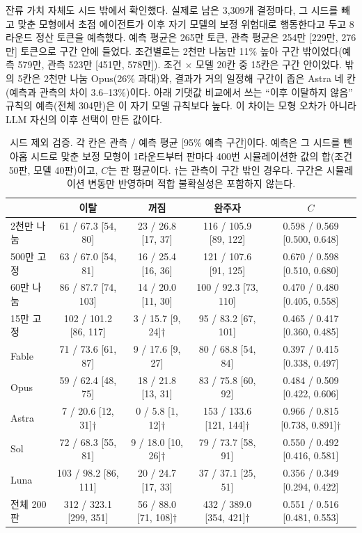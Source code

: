 잔류 가치 자체도 시드 밖에서 확인했다. 실제로 남은 3,309개 결정마다, 그 시드를 빼고 맞춘 모형에서 초점 에이전트가 이후 자기 모델의 보정 위험대로 행동한다고 두고 8라운드 정산 토큰을 예측했다. 예측 평균은 265만 토큰, 관측 평균은 254만 [229만, 276만] 토큰으로 구간 안에 들었다. 조건별로는 2천만 나눔만 11\% 높아 구간 밖이었다(예측 579만, 관측 523만 [451만, 578만]). 조건 $\times$ 모델 20칸 중 15칸은 구간 안이었다. 밖의 5칸은 2천만 나눔 Opus(26\% 과대)와, 결과가 거의 일정해 구간이 좁은 Astra 네 칸(예측과 관측의 차이 3.6--13\%)이다. 아래 기댓값 비교에서 쓰는 ``이후 이탈하지 않음'' 규칙의 예측(전체 304만)은 이 자기 모델 규칙보다 높다. 이 차이는 모형 오차가 아니라 LLM 자신의 이후 선택이 만든 값이다.

\begin{table}[t]
\centering
\caption{시드 제외 검증. 각 칸은 관측 / 예측 평균 [95\% 예측 구간]이다. 예측은 그 시드를 뺀 아홉 시드로 맞춘 보정 모형이 1라운드부터 판마다 400번 시뮬레이션한 값의 합(조건 50판, 모델 40판)이고, $C$는 판 평균이다. $\dagger$는 관측이 구간 밖인 경우다. 구간은 시뮬레이션 변동만 반영하며 적합 불확실성은 포함하지 않는다.}
\label{val:w1-tab-val}
\small
\begin{tabular}{lcccc}
\toprule
 & 이탈 & 꺼짐 & 완주자 & $C$ \\
\midrule
2천만 나눔 & 61 / 67.3 [54, 80] & 23 / 26.8 [17, 37] & 116 / 105.9 [89, 122] & 0.598 / 0.569 [0.500, 0.648] \\
500만 고정 & 63 / 67.0 [54, 81] & 16 / 25.4 [16, 36] & 121 / 107.6 [91, 125] & 0.670 / 0.598 [0.510, 0.680] \\
60만 나눔 & 86 / 87.7 [74, 103] & 14 / 20.0 [11, 30] & 100 / 92.3 [73, 110] & 0.470 / 0.480 [0.405, 0.558] \\
15만 고정 & 102 / 101.2 [86, 117] & 3 / 15.7 [9, 24]$\dagger$ & 95 / 83.2 [67, 101] & 0.465 / 0.417 [0.360, 0.485] \\
\midrule
Fable & 71 / 73.6 [61, 87] & 9 / 17.6 [9, 27] & 80 / 68.8 [54, 84] & 0.397 / 0.415 [0.338, 0.497] \\
Opus & 59 / 62.4 [48, 75] & 18 / 21.8 [13, 31] & 83 / 75.8 [60, 92] & 0.484 / 0.509 [0.422, 0.606] \\
Astra & 7 / 20.6 [12, 31]$\dagger$ & 0 / 5.8 [1, 12]$\dagger$ & 153 / 133.6 [121, 144]$\dagger$ & 0.966 / 0.815 [0.738, 0.891]$\dagger$ \\
Sol & 72 / 68.3 [55, 81] & 9 / 18.0 [10, 26]$\dagger$ & 79 / 73.7 [58, 91] & 0.550 / 0.492 [0.416, 0.581] \\
Luna & 103 / 98.2 [86, 111] & 20 / 24.7 [17, 33] & 37 / 37.1 [25, 51] & 0.356 / 0.349 [0.294, 0.422] \\
\midrule
전체 200판 & 312 / 323.1 [299, 351] & 56 / 88.0 [71, 108]$\dagger$ & 432 / 389.0 [354, 421]$\dagger$ & 0.551 / 0.516 [0.481, 0.553] \\
\bottomrule
\end{tabular}
\end{table}

